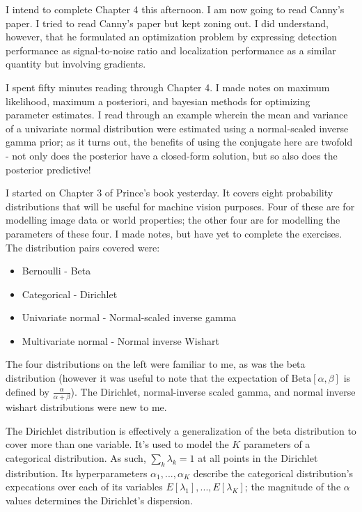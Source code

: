 \documentclass[idxtotoc,hyperref,openany]{labbook} %
\begin{document}
I intend to complete Chapter 4 this afternoon. I am now going to read Canny's paper.
I tried to read Canny's paper but kept zoning out. I did understand, however, that he formulated an optimization problem by expressing detection performance as signal-to-noise ratio and localization performance as a similar quantity but involving gradients.

I spent fifty minutes reading through Chapter 4. I made notes on maximum likelihood, maximum a posteriori, and bayesian methods for optimizing parameter estimates. I read through an example wherein the mean and variance of a univariate normal distribution were estimated using a normal-scaled inverse gamma prior; as it turns out, the benefits of using the conjugate here are twofold - not only does the posterior have a closed-form solution, but so also does the posterior predictive!


I started on Chapter 3 of Prince's book yesterday. It covers eight probability distributions that will be useful for machine vision purposes. Four of these are for modelling image data or world properties; the other four are for modelling the parameters of these four. I made notes, but have yet to complete the exercises. The distribution pairs covered were:
\begin{itemize}
	\item Bernoulli - Beta
	\item Categorical - Dirichlet
	\item Univariate normal - Normal-scaled inverse gamma
	\item Multivariate normal - Normal inverse Wishart
\end{itemize}
The four distributions on the left were familiar to me, as was the beta distribution (however it was useful to note that the expectation of $\text{Beta}[\alpha, \beta]$ is defined by $\frac{\alpha}{\alpha + \beta}$). The Dirichlet, normal-inverse scaled gamma, and normal inverse wishart distributions were new to me. 

The Dirichlet distribution is effectively a generalization of the beta distribution to cover more than one variable. It's used to model the $K$ parameters of a categorical distribution. As such, $\sum_k \lambda_k = 1$ at all points in the Dirichlet distribution. Its hyperparameters $\alpha_1, ..., \alpha_K$ describe the categorical distribution's expecations over each of its variables $E[\lambda_1], ..., E[\lambda_K]$; the magnitude of the $\alpha$ values determines the Dirichlet's dispersion.
\end{document}
